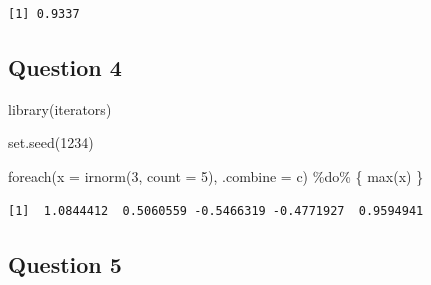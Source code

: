 \documentclass[
  letterpaper,
  DIV=11,
  numbers=noendperiod]{scrreprt}
\newenvironment{Shaded}{\begin{snugshade}}{\end{snugshade}}
\newcommand{\AttributeTok}[1]{\textcolor[rgb]{0.40,0.45,0.13}{#1}}
\newcommand{\DecValTok}[1]{\textcolor[rgb]{0.68,0.00,0.00}{#1}}
\newcommand{\FunctionTok}[1]{\textcolor[rgb]{0.28,0.35,0.67}{#1}}
\newcommand{\NormalTok}[1]{\textcolor[rgb]{0.00,0.23,0.31}{#1}}
\newcommand{\SpecialCharTok}[1]{\textcolor[rgb]{0.37,0.37,0.37}{#1}}
\begin{document}
\begin{verbatim}
[1] 0.9337
\end{verbatim}

\subsection{Question 4}\label{question-4}

\begin{Shaded}
\begin{Highlighting}[]
\FunctionTok{library}\NormalTok{(iterators)}

\FunctionTok{set.seed}\NormalTok{(}\DecValTok{1234}\NormalTok{)}

\FunctionTok{foreach}\NormalTok{(}\AttributeTok{x =} \FunctionTok{irnorm}\NormalTok{(}\DecValTok{3}\NormalTok{, }\AttributeTok{count =} \DecValTok{5}\NormalTok{), }\AttributeTok{.combine =}\NormalTok{ c) }\SpecialCharTok{\%do\%}\NormalTok{ \{}
  \FunctionTok{max}\NormalTok{(x)}
\NormalTok{\}}
\end{Highlighting}
\end{Shaded}

\begin{verbatim}
[1]  1.0844412  0.5060559 -0.5466319 -0.4771927  0.9594941
\end{verbatim}

\subsection{Question 5}\label{question-5}
\end{document}
